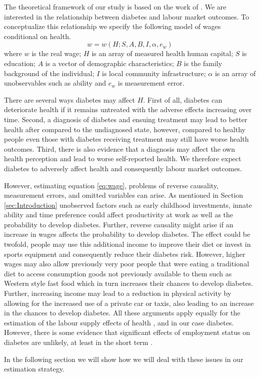 The theoretical framework of our study is based on the work of \citet{Strauss1998}. We are interested in the relationship between diabetes and labour market outcomes. To conceptualize this relationship we specify the following model of wages conditional on health.
\begin{equation}
w=w(H;S,A,B,I,\alpha,e_{w})\label{eq:wage}
\end{equation}
where $w$ is the real wage; $H$ is an array of measured health human capital; $S$ is education; $A$ is a vector of demographic characteristics; $B$ is the family background of the individual; $I$ is local community infrastructure; $\alpha$ is an array of unobservables such as ability and $e_w$ is measurement error. 

There are several ways diabetes may affect $H$. First of all, diabetes can deteriorate health if it remains untreated with the adverse effects increasing over time. Second, a diagnosis of diabetes and ensuing treatment may lead to better health after compared to the undiagnosed state, however, compared to healthy people even those with diabetes receiving treatment may still have worse health outcomes. Third, there is also evidence that a diagnosis may affect the own health perception and lead to worse self-reported health. We therefore expect diabetes to adversely affect health and consequently labour market outcomes.

However, estimating equation  \ref{eq:wage}, problems of reverse causality, measurement errors, and omitted variables can arise. As mentioned in Section  \ref{sec:Introduction} unobserved factors such as early childhood investments, innate ability and time preference could affect productivity at work as well as the probability to develop diabetes. Further, reverse causality might arise if an increase in wages affects the probability to develop diabetes. The effect could be twofold, people may use this additional income to improve their diet or invest in sports equipment and consequently reduce their diabetes risk. However, higher wages may also allow previously very poor people that were eating a traditional diet to access consumption goods not previously available to them such as Western style fast food which in turn increases their chances to develop diabetes. Further, increasing income may lead to a reduction in physical activity by allowing for the increased use of a private car or taxis, also leading to an increase in the chances to develop diabetes. All these arguments apply equally for the estimation of the labour supply effects of health \citep{Strauss2007}, and in our case diabetes. However, there is some evidence that significant effects of employment status on diabetes are unlikely, at least in the short term \citep{Schaller2015}.

  

In the following section we will show how we will deal with these issues in our estimation strategy.